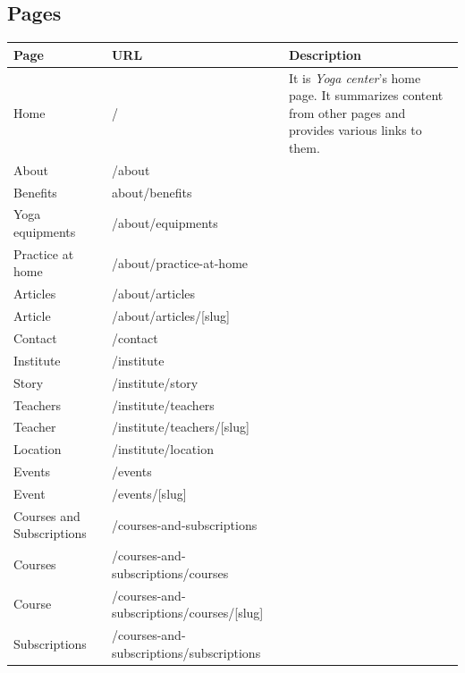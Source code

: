 \subsection{Pages}

\begin{center}
    \begin{tabularx}{\textwidth}{|X|X|X|}
        \hline
        \textbf{Page} & \textbf{URL} & \textbf{Description} \\
        \hline
        Home & / & It is \textit{Yoga center}’s home page. It summarizes content from other pages and provides various
        links to them.\\
        \hline
        About & /about & \\
        \hline
        Benefits & about/benefits & \\
        \hline
        Yoga equipments & /about/equipments & \\
        \hline
        Practice at home & /about/practice-at-home & \\
        \hline
        Articles & /about/articles & \\
        \hline
        Article & /about/articles/[slug] & \\
        \hline
        Contact & /contact & \\
        \hline
        Institute & /institute & \\
        \hline
        Story & /institute/story & \\
        \hline
        Teachers & /institute/teachers & \\
        \hline
        Teacher & /institute/teachers/[slug] & \\
        \hline
        Location & /institute/location & \\
        \hline
        Events & /events & \\
        \hline
        Event & /events/[slug] & \\
        \hline
        Courses and Subscriptions & /courses-and-subscriptions & \\
        \hline
        Courses & /courses-and-subscriptions/courses & \\
        \hline
        Course & /courses-and-subscriptions/courses/[slug] & \\
        \hline
        Subscriptions & /courses-and-subscriptions/subscriptions & \\
        \hline



    \end{tabularx}
\end{center}

